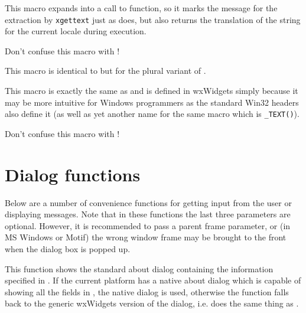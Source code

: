 This macro expands into a call to 
function, so it marks the message for the extraction by {\tt xgettext} just as
 does, but also returns the translation of
the string for the current locale during execution.

Don't confuse this macro with !


\label{wxplural}


This macro is identical to  but for the plural variant
of .


\label{underscoret}



This macro is exactly the same as  and is defined in
wxWidgets simply because it may be more intuitive for Windows programmers as
the standard Win32 headers also define it (as well as yet another name for the
same macro which is {\tt \_TEXT()}).

Don't confuse this macro with !



\section{Dialog functions}\label{dialogfunctions}

Below are a number of convenience functions for getting input from the
user or displaying messages. Note that in these functions the last three
parameters are optional. However, it is recommended to pass a parent frame
parameter, or (in MS Windows or Motif) the wrong window frame may be brought to
the front when the dialog box is popped up.


\label{wxaboutbox}


This function shows the standard about dialog containing the information
specified in . If the current platform has a native about dialog
which is capable of showing all the fields in , the native dialog is
used, otherwise the function falls back to the generic wxWidgets version of the
dialog, i.e. does the same thing as .


